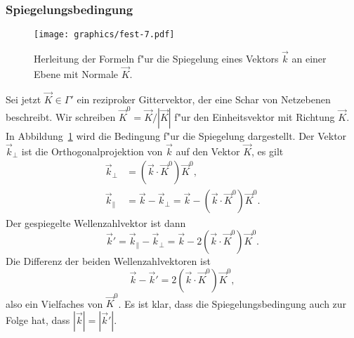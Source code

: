\subsubsection{Spiegelungsbedingung}
\begin{figure}
\centering
\texttt{[image: graphics/fest-7.pdf]}
\caption{Herleitung der Formeln f"ur die Spiegelung eines Vektors $\vec k$
an einer Ebene mit Normale $\vec K$.
\label{skript:spiegelungsbedingung}}
\end{figure}
Sei jetzt $\vec K\in\Gamma'$ ein reziproker Gittervektor, der eine
Schar von Netzebenen beschreibt.
Wir schreiben $\vec K^0=\vec K/|\vec K|$ f"ur den Einheitsvektor mit
Richtung $\vec K$.
In Abbildung~\ref{skript:spiegelungsbedingung} wird die Bedingung f"ur die
Spiegelung dargestellt. 
Der Vektor $\vec k_{\perp}$ ist die Orthogonalprojektion von $\vec k$
auf den Vektor $\vec K$, es gilt
\begin{align*}
\vec k_{\perp}&=(\vec k\cdot\vec K^0)\vec K^0,
\\
\vec k_{\|}&=\vec k -\vec k_{\perp} = \vec k-(\vec k\cdot \vec K^0)\vec K^0.
\end{align*}
Der gespiegelte Wellenzahlvektor ist dann
\begin{equation}
\vec k'=\vec k_{\|}-\vec k_{\perp}=\vec k-2(\vec k\cdot\vec K^0)\vec K^0.
\end{equation}
Die Differenz der beiden Wellenzahlvektoren ist
\begin{equation}
\vec k- \vec k'=2(\vec k\cdot\vec K^0)\vec K^0,
\label{skript:wellenzahldifferenz}
\end{equation}
also ein Vielfaches von $\vec K^0$.
Es ist klar, dass die Spiegelungsbedingung auch zur Folge hat, dass
$|\vec k|=|\vec k'|$.

